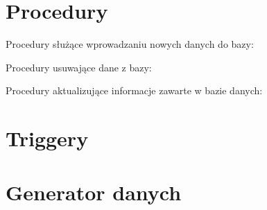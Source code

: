 \documentclass{article}
\begin{document}
\newpage
\section{Procedury}
Procedury służące wprowadzaniu nowych danych do bazy:
    
Procedury usuwające dane z bazy:
    
Procedury aktualizujące informacje zawarte w bazie danych:
    

\newpage
\section{Triggery}
    
    

\newpage
\section{Generator danych}
    
    
    
    
    
    
    
    
    
    
    
    
    
    
    
    
    
    
    
    
    
    
    
    
    
    
\end{document}
